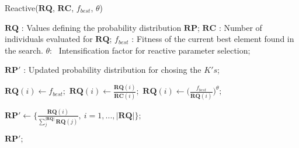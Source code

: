 \begin{algorithm*}
\caption{Reactive($\bm{RQ}$, $\bm{RC}$, $f_{best}$, $\theta$)}
\label{alg:Reactive}
\begin{algorithmic}[1]


\INPUT{}
\Statex $\bm{RQ}$ : Values defining the probability distribution $\bm{RP}$;
\Statex $\bm{RC}$ : Number of individuals evaluated for $\bm{RQ}$;
\Statex $f_{best}$ : Fitness of the current best element found in the search.
\Statex $\theta$: \quad \, Intensification factor for reactive parameter selection;
\Statex

\OUTPUT{}
\Statex $\bm{RP}'$ : Updated probability distribution for chosing the $K's$;
\Statex
\Statex



\State $\bm{RQ}(i) \gets f_{best};$
\Else
\State $\bm{RQ}(i) \gets \frac{\bm{RQ}(i)}{\bm{RC}(i)};$
\EndIf
\Statex
\State $\bm{RQ}(i) \gets \Big( \frac{f_{best}}{\bm{RQ}(i)} \Big)^{\theta};$
\EndFor
\Statex

\State $\bm{RP}' \gets \{\frac{\bm{RQ}(i)}{\sum_j^{|\bm{RQ}|} \bm{RQ}(j)}, \ i = 1, ..., |\bm{RQ}|\};$
\Statex


\State \Return $\bm{RP}';$


\end{algorithmic}
\end{algorithm*}